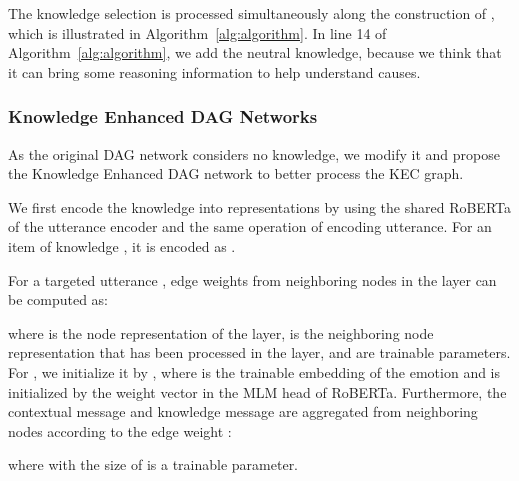 \documentclass{article}
\begin{document}
The knowledge selection is processed simultaneously along the construction of , which is illustrated in Algorithm~\ref{alg:algorithm}. In line 14 of Algorithm~\ref{alg:algorithm}, we add the neutral knowledge, because we think that it can bring some reasoning information to help understand causes. 

\subsubsection{Knowledge Enhanced DAG Networks}

As the original DAG network considers no knowledge, we modify it and propose the Knowledge Enhanced DAG network to better process the KEC graph. 

We first encode the knowledge into representations by using the shared RoBERTa of the utterance encoder and the same operation of encoding utterance. For an item of knowledge , it is encoded as . 

For a targeted utterance , edge weights from neighboring nodes  in the  layer can be computed as:

where  is the node representation of the  layer,  is the neighboring node representation that has been processed in the  layer,  and  are trainable parameters. For , we initialize it by , where  is the trainable embedding of the emotion  and is initialized by the weight vector in the MLM head of RoBERTa. Furthermore, the contextual message and knowledge message are aggregated from neighboring nodes according to the edge weight :

where  with the size of  is a trainable parameter. 

\begin{table}[]
\centering
{}
\caption{Statistics of RECCON-DD. ``Positive'' means the true causal pair. }
\vspace{-0.2cm}
\label{dataset}
\end{table}
\end{document}
